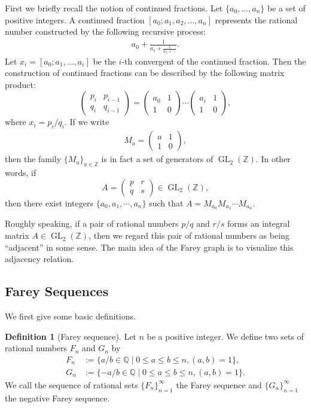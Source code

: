 \documentclass[10pt, a4paper]{article}
\newcommand{\Z}{\mathbb{Z}}
\newcommand{\Q}{\mathbb{Q}}
\newcommand{\GL}{\operatorname{GL}_2(\Z)}
\theoremstyle{definition}
\newtheorem{definition}[theorem]{Definition}
\theoremstyle{remark}
\begin{document}
First we briefly recall the notion of continued fractions. Let \(\{a_0,\dots,a_n\}\) be a set of positive integers. A continued fraction
\([a_0; a_1, a_2, \dots, a_n]\) represents the rational number constructed by the following recursive process:
\begin{align*}
    a_0 + \frac{1}{a_1 + \frac{1}{a_2 + \dots}} .
\end{align*}
Let \(x_i=[a_0;a_1,\dots,a_i]\) be the \(i\)-th convergent of the continued fraction. Then the construction of continued fractions can be described by the following matrix product:
$$
\begin{pmatrix} p_i & p_{i-1} \\ q_i & q_{i-1} \end{pmatrix}
=
\begin{pmatrix} a_0 & 1 \\ 1 & 0 \end{pmatrix}
\cdots
\begin{pmatrix} a_i & 1 \\ 1 & 0 \end{pmatrix},
$$
where \(x_i=p_i/q_i\). If we write
\begin{align*}
    M_a = \begin{pmatrix} a & 1 \\ 1 & 0 \end{pmatrix},
\end{align*}
then the family \(\{M_a\}_{a\in\Z}\) is in fact a set of generators of \(\GL\). In other words, if
$$
A = \begin{pmatrix} p & r \\ q & s \end{pmatrix} \in \GL,
$$
then there exist integers \(\{a_0,a_1,\cdots,a_n\}\) such that
\(A=M_{a_0}M_{a_1}\cdots M_{a_n}\).

Roughly speaking, if a pair of rational numbers \(p/q\) and \(r/s\) forms an integral matrix \(A\in\GL\), then we regard this pair of rational numbers as being ``adjacent'' in some sense. The main idea of the Farey graph is to visualize this adjacency relation.

\subsection{Farey Sequences}

We first give some basic definitions.

\begin{definition}[Farey sequence]
    Let \(n\) be a positive integer. We define two sets of rational numbers \(F_n\) and \(G_n\) by
    \begin{align*}
        F_n &:=\{a/b\in\Q \mid 0\le a \le b \le n,(a,b)=1\},\\
        G_n &:= \{-a/b\in\Q \mid 0\le a \le b \le n,(a,b)=1\}.
    \end{align*}
    We call the sequence of rational sets \(\{F_n\}_{n=1}^{\infty}\) the Farey sequence and \(\{G_n\}_{n=1}^\infty\) the negative Farey sequence.
\end{definition}
\end{document}
